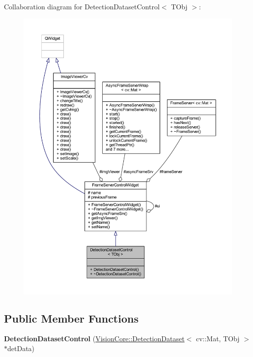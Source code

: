 Collaboration diagram for Detection\+Dataset\+Control$<$ T\+Obj $>$\+:
\nopagebreak
\begin{figure}[H]
\begin{center}
\leavevmode
\includegraphics[width=350pt]{class_detection_dataset_control__coll__graph}
\end{center}
\end{figure}
\subsection*{Public Member Functions}
\begin{DoxyCompactItemize}
\item 
\hypertarget{class_detection_dataset_control_a9fd1de3909b08bbf725de0f0156fe41c}{}{\bfseries Detection\+Dataset\+Control} (\hyperlink{class_vision_core_1_1_evaluation_1_1_detection_dataset}{Vision\+Core\+::\+Detection\+Dataset}$<$ cv\+::\+Mat, T\+Obj $>$ $\ast$det\+Data)\label{class_detection_dataset_control_a9fd1de3909b08bbf725de0f0156fe41c}

\end{DoxyCompactItemize}
